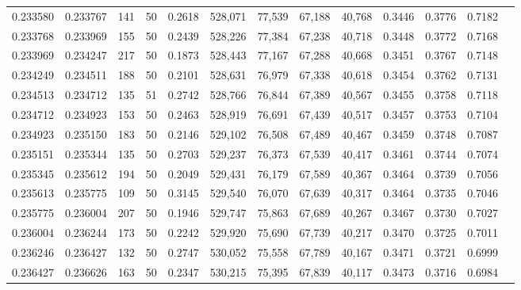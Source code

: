 \begin{tabular}{rrrrrrrrrrrrr}
0.233580 & 0.233767 &   141 &  50 &                                     0.2618 & 528,071 &  77,539 &  67,188 &  40,768 & 0.3446 & 0.3776 & 0.7182 \\
0.233768 & 0.233969 &   155 &  50 &                                     0.2439 & 528,226 &  77,384 &  67,238 &  40,718 & 0.3448 & 0.3772 & 0.7168 \\
0.233969 & 0.234247 &   217 &  50 &                                     0.1873 & 528,443 &  77,167 &  67,288 &  40,668 & 0.3451 & 0.3767 & 0.7148 \\
0.234249 & 0.234511 &   188 &  50 &                                     0.2101 & 528,631 &  76,979 &  67,338 &  40,618 & 0.3454 & 0.3762 & 0.7131 \\
0.234513 & 0.234712 &   135 &  51 &                                     0.2742 & 528,766 &  76,844 &  67,389 &  40,567 & 0.3455 & 0.3758 & 0.7118 \\
0.234712 & 0.234923 &   153 &  50 &                                     0.2463 & 528,919 &  76,691 &  67,439 &  40,517 & 0.3457 & 0.3753 & 0.7104 \\
0.234923 & 0.235150 &   183 &  50 &                                     0.2146 & 529,102 &  76,508 &  67,489 &  40,467 & 0.3459 & 0.3748 & 0.7087 \\
0.235151 & 0.235344 &   135 &  50 &                                     0.2703 & 529,237 &  76,373 &  67,539 &  40,417 & 0.3461 & 0.3744 & 0.7074 \\
0.235345 & 0.235612 &   194 &  50 &                                     0.2049 & 529,431 &  76,179 &  67,589 &  40,367 & 0.3464 & 0.3739 & 0.7056 \\
0.235613 & 0.235775 &   109 &  50 &                                     0.3145 & 529,540 &  76,070 &  67,639 &  40,317 & 0.3464 & 0.3735 & 0.7046 \\
0.235775 & 0.236004 &   207 &  50 &                                     0.1946 & 529,747 &  75,863 &  67,689 &  40,267 & 0.3467 & 0.3730 & 0.7027 \\
0.236004 & 0.236244 &   173 &  50 &                                     0.2242 & 529,920 &  75,690 &  67,739 &  40,217 & 0.3470 & 0.3725 & 0.7011 \\
0.236246 & 0.236427 &   132 &  50 &                                     0.2747 & 530,052 &  75,558 &  67,789 &  40,167 & 0.3471 & 0.3721 & 0.6999 \\
0.236427 & 0.236626 &   163 &  50 &                                     0.2347 & 530,215 &  75,395 &  67,839 &  40,117 & 0.3473 & 0.3716 & 0.6984 \\

\end{tabular}
